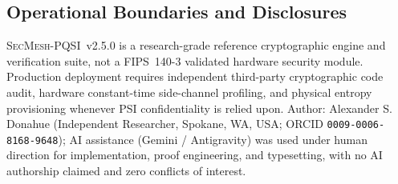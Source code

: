\documentclass[11pt,reqno]{amsart}
\newcommand{\code}[1]{\texttt{\small #1}}
\begin{document}
\subsection*{Operational Boundaries and Disclosures}
\textsc{SecMesh-PQSI}~v2.5.0 is a research-grade reference cryptographic engine and verification suite, not a FIPS~140-3 validated hardware security module. Production deployment requires independent third-party cryptographic code audit, hardware constant-time side-channel profiling, and physical entropy provisioning whenever PSI confidentiality is relied upon.
Author: Alexander S. Donahue (Independent Researcher, Spokane, WA, USA; ORCID \code{0009-0006-8168-9648}); AI assistance (Gemini / Antigravity) was used under human direction for implementation, proof engineering, and typesetting, with no AI authorship claimed and zero conflicts of interest.



\end{document}
